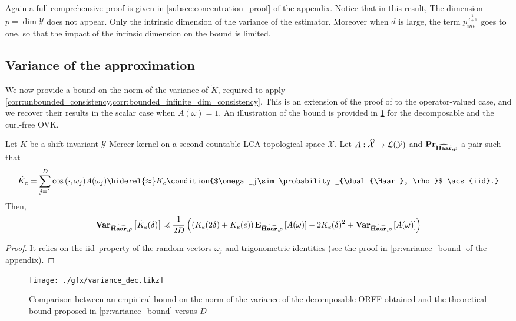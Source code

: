 Again a full comprehensive proof is given in \cref{subsec:concentration_proof}
of the appendix. Notice that in this result, The dimension
$p=\dim{\mathcal{Y}}$ does not appear. Only the intrinsic dimension of the
variance of the estimator. Moreover when $d$ is large, the term
$p_{int}^{\frac{1}{d + 1}}$ goes to one, so that the impact of the inrinsic
dimension on the bound is limited.

\subsection{Variance of the  approximation}
We now provide a bound on the norm of the variance of $\tilde{K}$, required to
apply \cref{corr:unbounded_consistency,corr:bounded_infinite_dim_consistency}.
This is an extension of the proof of \citet{sutherland2015} to the
operator-valued case, and we recover their results in the scalar case when
$A(\omega)=1$. An illustration of the bound is provided in
\cref{fig:approximation_error_var} for the decomposable and the curl-free
\acs{OVK}.
\begin{proposition}
    \label{pr:variance_bound}
    Let $K$ be a shift invariant $\mathcal{Y}$-Mercer
    kernel on a second countable \ac{LCA} topological space $\mathcal{X}$. Let
    $A:\widehat{\mathcal{X}}\to\mathcal{L}(\mathcal{Y})$ and
    ${\mathbf{{Pr}}}_{\widehat{\mathbf{Haar}},\rho}$ a pair such that
    \begin{dmath*}
        \tilde{K}_e = \sum_{j=1}^D \cos{\pairing{\cdot,\omega_j}}A (\omega_j)
        \hiderel{\approx}
        K_e\condition{$\omega_j\sim\probability_{\dual{\Haar}, \rho}$
        \acs{iid}.}
    \end{dmath*}
    Then,
    \begin{dmath*}
        \variance_{\dual{\Haar}, \rho} \left[ \tilde{K}_e(\delta) \right]
        \preccurlyeq \frac{1}{2D} \left( \left( K_e(2\delta) + K_e(e) \right)
        \expectation_{\dual{\Haar}, \rho}\left[ A(\omega) \right] -
        2 K_e(\delta)^2 + \variance_{\dual{\Haar}, \rho}\left[
        A(\omega) \right]\right)
    \end{dmath*}
\end{proposition}
\begin{proof}
    It relies on the \ac{iid}~property of the random vectors $\omega_j$ and
    trigonometric identities (see the proof in \cref{pr:variance_bound} of the
    appendix).
\end{proof}
\begin{figure}
    \centering
    \texttt{[image: ./gfx/variance\_dec.tikz]}
    \caption[decomposable ORFF variance bound]{Comparison between an empirical
    bound on the norm of the variance of the decomposable ORFF obtained and the
    theoretical bound proposed in \cref{pr:variance_bound} versus $D$
    \label{fig:approximation_error_var}}
\end{figure}
